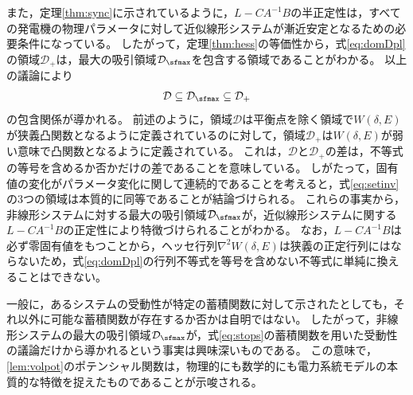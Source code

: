 \documentclass[tombow,dvipdfmx]{corona-a5}
\begin{document}
また，定理\ref{thm:sync}に示されているように，$L-CA^{-1}B$の半正定性は，すべての発電機の物理パラメータに対して近似線形システムが漸近安定となるための必要条件になっている。
したがって，定理\ref{thm:hess}の等価性から，式\ref{eq:domDpl}の領域$\mathcal{D}_{+}$は，最大の吸引領域$\mathcal{D}_{\sfmax}$を包含する領域であることがわかる。
以上の議論により
\begin{align}\label{eq:setinv}
\mathcal{D} \subseteq \mathcal{D}_{\sfmax} \subseteq \mathcal{D}_{+}
\end{align}
の包含関係が導かれる。
前述のように，領域$\mathcal{D}$は平衡点を除く領域で$W(\delta,E)$が狭義凸関数となるように定義されているのに対して，領域$\mathcal{D}_{+}$は$W(\delta,E)$が弱い意味で凸関数となるように定義されている。
これは，$\mathcal{D}$と$\mathcal{D}_{+}$の差は，不等式の等号を含めるか否かだけの差であることを意味している。
しがたって，固有値の変化がパラメータ変化に関して連続的であることを考えると，式\ref{eq:setinv}の3つの領域は本質的に同等であることが結論づけられる。
これらの事実から，非線形システムに対する最大の吸引領域$\mathcal{D}_{\sfmax}$が，近似線形システムに関する$L-CA^{-1}B$の正定性により特徴づけられることがわかる。
なお，$L-CA^{-1}B$は必ず零固有値をもつことから，ヘッセ行列$\nabla^2 W(\delta,E)$は狭義の正定行列にはならないため，式\ref{eq:domDpl}の行列不等式を等号を含めない不等式に単純に換えることはできない。

一般に，あるシステムの受動性が特定の蓄積関数に対して示されたとしても，それ以外に可能な蓄積関数が存在するか否かは自明ではない。
したがって，非線形システムの最大の吸引領域$\mathcal{D}_{\sfmax}$が，式\ref{eq:stops}の蓄積関数を用いた受動性の議論だけから導かれるという事実は興味深いものである。
この意味で，\ref{lem:volpot}のポテンシャル関数は，物理的にも数学的にも電力系統モデルの本質的な特徴を捉えたものであることが示唆される。





\newpage
\end{document}

